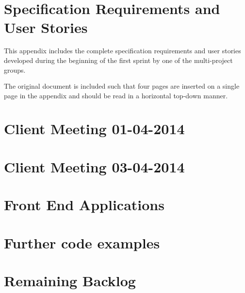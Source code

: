 \chapter{Specification Requirements and User Stories}\label{appendix:requirements}
This appendix includes the complete specification requirements and user stories developed during the beginning of the first sprint by one of the multi-project groups.

The original document is included such that four pages are inserted on a single page in the appendix and should be read in a horizontal top-down manner.



\chapter{Client Meeting 01-04-2014}\label{appendix:firstmeeting}


\chapter{Client Meeting 03-04-2014}\label{appendix:secondmeeting}


\chapter{Front End Applications}\label{sec:giraf:applications:frontend}


\chapter{Further code examples}\label{appendix:codeexamples}


\chapter{Remaining Backlog}\label{appendix:futureworks}
